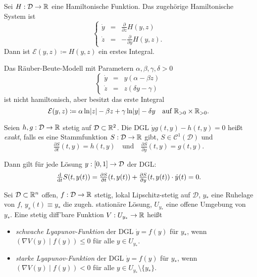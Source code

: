 \documentclass{cheat-sheet}
\newcommand{\D}{\mathcal{D}}
\newcommand{\E}{\mathcal{E}}
\newcommand{\scp}[2]{\left( #1 \!\mid\! #2 \right)} %
\begin{document}
\begin{bsp}
  Sei $H : \D \to \R$ eine Hamiltonische Funktion. Das zugehörige Hamiltonische System ist
  \[
    \left\{ \begin{array}{lll}
      \dot{y} &= & \tfrac{\partial}{\partial z} H(y, z) \\
      \dot{z} &= & - \tfrac{\partial}{\partial y} H(y, z).
    \end{array} \right.
  \]
  Dann ist $\E(y, z) \coloneqq H(y, z)$ ein erstes Integral.
\end{bsp}


\begin{bsp}
  Das Räuber-Beute-Modell mit Parametern $\alpha, \beta, \gamma, \delta > 0$
  \[
    \left\{ \begin{array}{lll}
      \dot{y} &= & y (\alpha - \beta z) \\
      \dot{z} &= & z (\delta y - \gamma)
    \end{array} \right.
  \]
  ist nicht hamiltonisch, aber besitzt das erste Integral
  \[
    \E(y, z) \coloneqq \alpha \ln \abs{z} - \beta z + \gamma \ln \abs{y} - \delta y
    \quad \text{auf } \R_{>0} \times \R_{>0}.
  \]
\end{bsp}

\begin{defn}
  Seien $h, g : \D \to \R$ stetig auf $\D \subset \R^2$. Die DGL $\dot{y} g(t, y) - h(t, y) = 0$ heißt \emph{exakt}, falls es eine Stammfunktion $S : \D \to \R$ gibt, \dh{} $S \in \mathcal{C}^1(\D)$ und
  \[
    \tfrac{\partial S}{\partial t} (t, y) = h(t, y)
    \quad \text{und} \quad
    \tfrac{\partial S}{\partial y} (t, y) = g(t, y).
  \]
\end{defn}

\begin{bem}
  Dann gilt für jede Lösung $y : \I \to \D$ der DGL:
  \[
    \tfrac{\d}{\d t} S(t, y(t)) = \tfrac{\partial S}{\partial t} (t, y(t)) + \tfrac{\partial S}{\partial y} (t, y(t)) \cdot \dot{y}(t) = 0. %
  \]
\end{bem}


\begin{defn}
  Sei $\D \subset \R^n$ offen, $f : \D \to \R$ stetig, lokal Lipschitz-stetig auf $\D$, $y_{*}$ eine Ruhelage von $f$, $y_s(t) \equiv y_{*}$ die zugeh. stationäre Lösung, $U_{y_{*}}$ eine offene Umgebung von $y_{*}$. Eine stetig diff'bare Funktion $V : U_{y_{*}} \to \mathbb{R}$ heißt
  \begin{itemize}
    \item \emph{schwache Lyapunov-Funktion} der DGL $\dot{y} = f(y)$ für $y_{*}$, wenn $\scp{\nabla V(y)}{f(y)} \leq 0$ für alle $y \in U_{y_{*}}$.
    \item \emph{starke Lyapunov-Funktion} der DGL $\dot{y} = f(y)$ für $y_{*}$, wenn $\scp{\nabla V(y)}{f(y)} < 0$ für alle $y \in U_{y_{*}} \setminus \{ y_{*} \}$.
  \end{itemize}
\end{defn}
\end{document}
